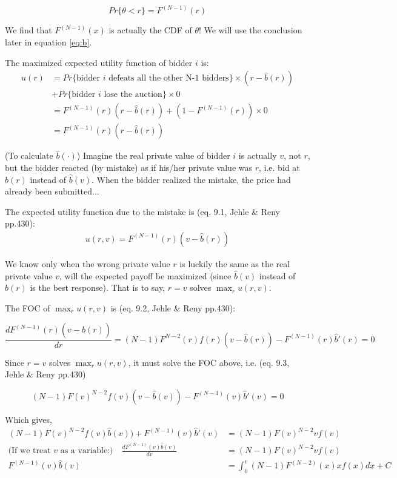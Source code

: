 \documentclass{article}
\begin{document}
\begin{mdframed}[backgroundcolor=blue!20,linecolor=white]
\begin{equation}
Pr\{\theta < r\} = F^{(N-1)}(r)
    \label{eq:second}   
\end{equation}

We find that  $F^{(N-1)}(x)$ is actually the CDF of $\theta$! We will use the conclusion later in equation \ref{eq:b}.

\medskip

The maximized expected utility function of bidder $i$ is:
\begin{align*}
u(r)&= Pr\{\text{bidder $i$ defeats all the other N-1 bidders}\} \times (r-\hat{b}(r)) \\&+  Pr\{\text{bidder $i$ lose the auction}\} \times 0 \\ 
&= F^{(N-1)}(r) (r-\hat{b}(r)) + (1-F^{(N-1)}(r))\times 0 \\
&= F^{(N-1)}(r) (r-\hat{b}(r))
\end{align*}

(To calculate $\hat{b}(\cdot)$) Imagine the real private value of bidder $i$ is actually $v$, not $r$, but the bidder reacted (by mistake) as if his/her private value was $r$, i.e. bid at $\hat{b}(r)$ instead of $\hat{b}(v)$. When the bidder realized the mistake, the price had already been submitted...

\medskip

The expected utility function due to the mistake is (eq. 9.1, Jehle \& Reny pp.430):
\begin{align*}
u(r,v)= F^{(N-1)}(r) (v-\hat{b}(r))
\end{align*}

We know only when the wrong private value $r$ is luckily the same as the real private value $v$, will the expected payoff be maximized (since $\hat{b}(v)$ instead of $\hat{b}(r)$ is the best response). That is to say, $r=v$ solves $\max_{r} u(r,v)$.

\medskip

The FOC of $\max_{r} u(r,v)$ is (eq. 9.2, Jehle \& Reny pp.430):

$$\frac{d F^{(N-1)}(r)(v-\hat{b}(r))}{d r} = (N-1)F^{N-2}(r)f(r)(v-\hat{b}(r))-F^{(N-1)}(r)\hat{b}'(r)=0$$

Since $r=v$ solves $\max_{r} u(r,v)$, it must solve the FOC above, i.e. (eq. 9.3, Jehle \& Reny pp.430)

$$(N-1)F(v)^{N-2}f(v)(v-\hat{b}(v))-F^{(N-1)}(v)\hat{b}'(v)=0$$

Which gives,
\begin{align*}
(N-1)F(v)^{N-2}f(v)\hat{b}(v))+ F^{(N-1)}(v)\hat{b}'(v) &= (N-1)F(v)^{N-2}vf(v) \\
\text{(If we treat $v$ as a variable:)} \quad \frac{d F^{(N-1)}(v)\hat{b}(v)}{d v} &= (N-1)F(v)^{N-2}vf(v) \\
F^{(N-1)}(v)\hat{b}(v)&= \int_0^{v} (N-1)F^{(N-2)}(x)xf(x)dx + C
\end{align*}


\end{mdframed}
\end{document}
